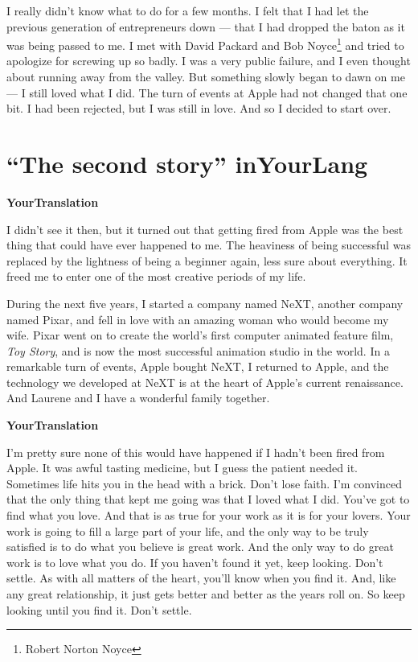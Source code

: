 \documentclass[a4,twocolumn]{article}
\begin{document}
I really didn't know what to do for a few months. I felt that I had let the previous generation of entrepreneurs down — that I had dropped the baton as it was being passed to me. I met with David Packard and Bob Noyce\footnote{Robert Norton Noyce} and tried to apologize for screwing up so badly. I was a very public failure, and I even thought about running away from the valley. But something slowly began to dawn on me — I still loved what I did. The turn of events at Apple had not changed that one bit. I had been rejected, but I was still in love. And so I decided to start over.

\newpage

\section*{``The second story'' inYourLang}

{\bf YourTranslation}

\newpage

I didn't see it then, but it turned out that getting fired from Apple was the best thing that could have ever happened to me. The heaviness of being successful was replaced by the lightness of being a beginner again, less sure about everything. It freed me to enter one of the most creative periods of my life.

During the next five years, I started a company named NeXT, another company named Pixar, and fell in love with an amazing woman who would become my wife. Pixar went on to create the world's first computer animated feature film, \textit{Toy Story}, and is now the most successful animation studio in the world. In a remarkable turn of events, Apple bought NeXT, I returned to Apple, and the technology we developed at NeXT is at the heart of Apple's current renaissance. And Laurene and I have a wonderful family together.

\newpage

{\bf YourTranslation}

\newpage

I'm pretty sure none of this would have happened if I hadn't been fired from Apple. It was awful tasting medicine, but I guess the patient needed it. Sometimes life hits you in the head with a brick. Don't lose faith. I'm convinced that the only thing that kept me going was that I loved what I did. You've got to find what you love. And that is as true for your work as it is for your lovers. Your work is going to fill a large part of your life, and the only way to be truly satisfied is to do what you believe is great work. And the only way to do great work is to love what you do. If you haven't found it yet, keep looking. Don't settle. As with all matters of the heart, you'll know when you find it. And, like any great relationship, it just gets better and better as the years roll on. So keep looking until you find it. Don't settle.
\end{document}
